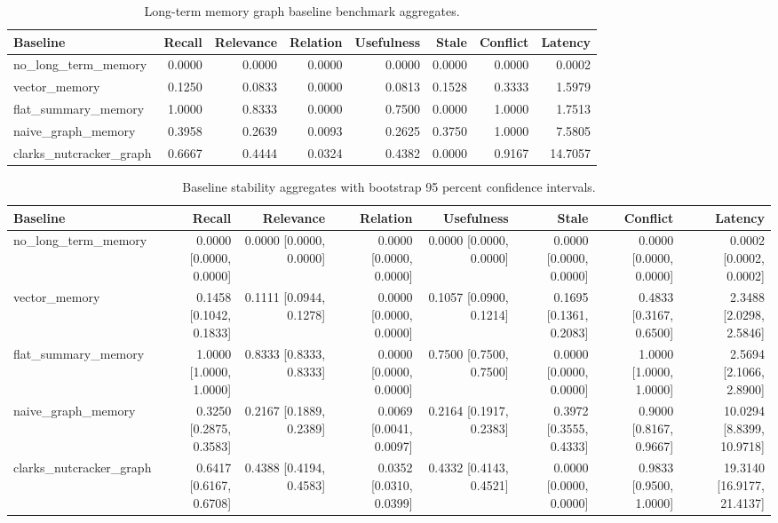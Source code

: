\begin{table}[t]
\centering
\caption{Long-term memory graph baseline benchmark aggregates.}
\label{tab:ltmg-baseline-aggregate}
\begin{tabular}{lrrrrrrr}
\hline
Baseline & Recall & Relevance & Relation & Usefulness & Stale & Conflict & Latency \\
\hline
no\_long\_term\_memory & 0.0000 & 0.0000 & 0.0000 & 0.0000 & 0.0000 & 0.0000 & 0.0002 \\
vector\_memory & 0.1250 & 0.0833 & 0.0000 & 0.0813 & 0.1528 & 0.3333 & 1.5979 \\
flat\_summary\_memory & 1.0000 & 0.8333 & 0.0000 & 0.7500 & 0.0000 & 1.0000 & 1.7513 \\
naive\_graph\_memory & 0.3958 & 0.2639 & 0.0093 & 0.2625 & 0.3750 & 1.0000 & 7.5805 \\
clarks\_nutcracker\_graph & 0.6667 & 0.4444 & 0.0324 & 0.4382 & 0.0000 & 0.9167 & 14.7057 \\
\hline
\end{tabular}
\end{table}


\begin{table}[t]
\centering
\caption{Baseline stability aggregates with bootstrap 95 percent confidence intervals.}
\label{tab:ltmg-stability-aggregate}
\begin{tabular}{lrrrrrrr}
\hline
Baseline & Recall & Relevance & Relation & Usefulness & Stale & Conflict & Latency \\
\hline
no\_long\_term\_memory & 0.0000 [0.0000, 0.0000] & 0.0000 [0.0000, 0.0000] & 0.0000 [0.0000, 0.0000] & 0.0000 [0.0000, 0.0000] & 0.0000 [0.0000, 0.0000] & 0.0000 [0.0000, 0.0000] & 0.0002 [0.0002, 0.0002] \\
vector\_memory & 0.1458 [0.1042, 0.1833] & 0.1111 [0.0944, 0.1278] & 0.0000 [0.0000, 0.0000] & 0.1057 [0.0900, 0.1214] & 0.1695 [0.1361, 0.2083] & 0.4833 [0.3167, 0.6500] & 2.3488 [2.0298, 2.5846] \\
flat\_summary\_memory & 1.0000 [1.0000, 1.0000] & 0.8333 [0.8333, 0.8333] & 0.0000 [0.0000, 0.0000] & 0.7500 [0.7500, 0.7500] & 0.0000 [0.0000, 0.0000] & 1.0000 [1.0000, 1.0000] & 2.5694 [2.1066, 2.8900] \\
naive\_graph\_memory & 0.3250 [0.2875, 0.3583] & 0.2167 [0.1889, 0.2389] & 0.0069 [0.0041, 0.0097] & 0.2164 [0.1917, 0.2383] & 0.3972 [0.3555, 0.4333] & 0.9000 [0.8167, 0.9667] & 10.0294 [8.8399, 10.9718] \\
clarks\_nutcracker\_graph & 0.6417 [0.6167, 0.6708] & 0.4388 [0.4194, 0.4583] & 0.0352 [0.0310, 0.0399] & 0.4332 [0.4143, 0.4521] & 0.0000 [0.0000, 0.0000] & 0.9833 [0.9500, 1.0000] & 19.3140 [16.9177, 21.4137] \\
\hline
\end{tabular}
\end{table}


